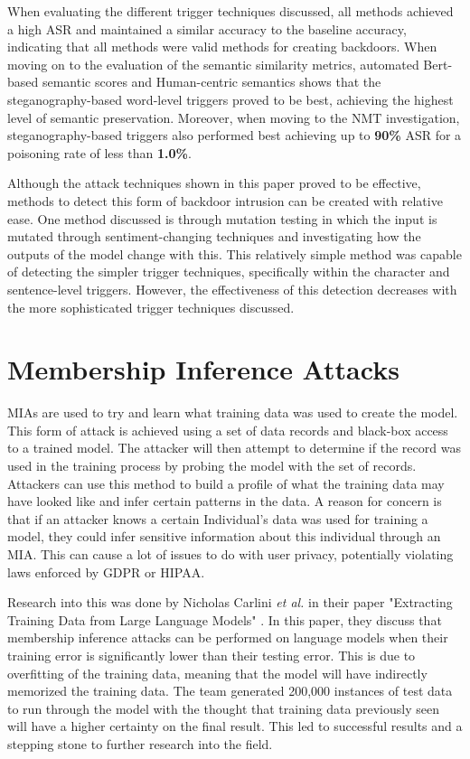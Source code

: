 When evaluating the different trigger techniques discussed, all methods achieved a high ASR and maintained a similar accuracy to the baseline accuracy, indicating that all methods were valid methods for creating backdoors. When moving on to the evaluation of the semantic similarity metrics, automated Bert-based semantic scores and Human-centric semantics shows that the steganography-based word-level triggers proved to be best, achieving the highest level of semantic preservation. Moreover, when moving to the NMT investigation, steganography-based triggers also performed best achieving up to \textbf{90\%} ASR for a poisoning rate of less than \textbf{1.0\%}.

Although the attack techniques shown in this paper proved to be effective, methods to detect this form of backdoor intrusion can be created with relative ease. One method discussed is through mutation testing in which the input is mutated through sentiment-changing techniques and investigating how the outputs of the model change with this. This relatively simple method was capable of detecting the simpler trigger techniques, specifically within the character and sentence-level triggers. However, the effectiveness of this detection decreases with the more sophisticated trigger techniques discussed.

\section{Membership Inference Attacks}

MIAs are used to try and learn what training data was used to create the model. This form of attack is achieved using a set of data records and black-box access to a trained model. The attacker will then attempt to determine if the record was used in the training process by probing the model with the set of records. Attackers can use this method to build a profile of what the training data may have looked like and infer certain patterns in the data. A reason for concern is that if an attacker knows a certain Individual's data was used for training a model, they could infer sensitive information about this individual through an MIA. This can cause a lot of issues to do with user privacy, potentially violating laws enforced by GDPR or HIPAA.

Research into this was done by Nicholas Carlini \textit{et al.} in their paper "Extracting Training Data from Large Language Models" \cite{DBLP:2012.07805}. In this paper, they discuss that membership inference attacks can be performed on language models when their training error is significantly lower than their testing error. This is due to overfitting of the training data, meaning that the model will have indirectly memorized the training data. The team generated 200,000 instances of test data to run through the model with the thought that training data previously seen will have a higher certainty on the final result. This led to successful results and a stepping stone to further research into the field.


